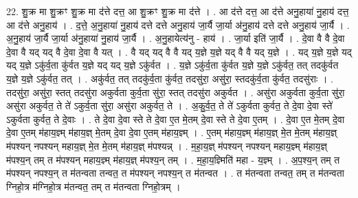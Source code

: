 \documentclass[17pt]{extarticle}
\begin{document}
22. शु॒क्र मा शु॒क्रꣳ शु॒क्र मा द॑त्ते दत्त॒ आ शु॒क्रꣳ शु॒क्र मा द॑त्ते । . आ द॑त्ते दत्त॒ आ द॑त्ते अनु॒हाया॑ नु॒हाय॑ दत्त॒ आ द॑त्ते अनु॒हाय॑ । . द॒त्ते॒ अ॒नु॒हाया॑ नु॒हाय॑ दत्ते दत्ते अनु॒हाय॑ जा॒र्यै जा॒र्या अ॑नु॒हाय॑ दत्ते दत्ते अनु॒हाय॑ जा॒र्यै । . अ॒नु॒हाय॑ जा॒र्यै जा॒र्या अ॑नु॒हाया॑ नु॒हाय॑ जा॒र्यै । . अ॒नु॒हायेत्य॑नु - हाय॑ । . जा॒र्या इति॑ जा॒र्यै । . दे॒वा वै वै दे॒वा दे॒वा वै यद् यद् वै दे॒वा दे॒वा वै यत् । . वै यद् यद् वै वै यद् य॒ज्ञे य॒ज्ञे यद् वै वै यद् य॒ज्ञे । . यद् य॒ज्ञे य॒ज्ञे यद् यद् य॒ज्ञे ऽकु॑र्व॒ता कु॑र्वत य॒ज्ञे यद् यद् य॒ज्ञे ऽकु॑र्वत । . य॒ज्ञे ऽकु॑र्व॒ता कु॑र्वत य॒ज्ञे य॒ज्ञे ऽकु॑र्वत॒ तत् तदकु॑र्वत य॒ज्ञे य॒ज्ञे ऽकु॑र्वत॒ तत् । . अकु॑र्वत॒ तत् तदकु॑र्व॒ता कु॑र्वत॒ तदसु॑रा॒ असु॑रा॒ स्तदकु॑र्व॒ता कु॑र्वत॒ तदसु॑राः । . तदसु॑रा॒ असु॑रा॒ स्तत् तदसु॑रा अकुर्वता कुर्व॒ता सु॑रा॒ स्तत् तदसु॑रा अकुर्वत । . असु॑रा अकुर्वता कुर्व॒ता सु॑रा॒ असु॑रा अकुर्वत॒ ते ते॑ ऽकुर्व॒ता सु॑रा॒ असु॑रा अकुर्वत॒ ते । . अ॒कु॒र्व॒त॒ ते ते॑ ऽकुर्वता कुर्वत॒ ते दे॒वा दे॒वा स्ते॑ ऽकुर्वता कुर्वत॒ ते दे॒वाः । . ते दे॒वा दे॒वा स्ते ते दे॒वा ए॒त मे॒तम् दे॒वा स्ते ते दे॒वा ए॒तम् । . दे॒वा ए॒त मे॒तम् दे॒वा दे॒वा ए॒तम् म॑हाय॒ज्ञ्म् म॑हाय॒ज्ञ् मे॒तम् दे॒वा दे॒वा ए॒तम् म॑हाय॒ज्ञ्म् । . ए॒तम् म॑हाय॒ज्ञ्म् म॑हाय॒ज्ञ् मे॒त मे॒तम् म॑हाय॒ज्ञ् म॑पश्यन् नपश्यन् महाय॒ज्ञ् मे॒त मे॒तम् म॑हाय॒ज्ञ् म॑पश्यन्न् । . म॒हा॒य॒ज्ञ् म॑पश्यन् नपश्यन् महाय॒ज्ञ्म् म॑हाय॒ज्ञ् म॑पश्य॒न् तम् त म॑पश्यन् महाय॒ज्ञ्म् म॑हाय॒ज्ञ् म॑पश्य॒न् तम् । . म॒हा॒य॒ज्ञ्मिति॑ महा - य॒ज्ञ्म् । . अ॒प॒श्य॒न् तम् त म॑पश्यन् नपश्य॒न् त म॑तन्वता तन्वत॒ त म॑पश्यन् नपश्य॒न् त म॑तन्वत । . त म॑तन्वता तन्वत॒ तम् त म॑तन्वता ग्निहो॒त्र म॑ग्निहो॒त्र म॑तन्वत॒ तम् त म॑तन्वता ग्निहो॒त्रम् । \newline
\end{document}
